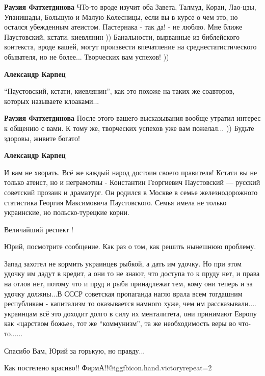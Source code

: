 \begin{itemize}
\begin{itemize}
\textbf{Раузия Фатхетдинова} ЧТо-то вроде изучит оба Завета, Талмуд, Коран, Лао-цзы, Упанишады, Большую и Малую Колесницы, если вы в курсе о чем это, но остался убежденным атеистом. Пастернака - так да! - не люблю. Мне ближе Паустовский, кстати, киевлянин ))
Банальности, вырванные из библейского контекста, вроде вашей, могут произвести впечатление на среднестатистического обывателя, но не более...
Творческих вам успехов! ))

\textbf{Александр Карпец} 

\enquote{Паустовский, кстати, киевлянин}, как это похоже на таких же соавторов,
которых называете клоаками...

\textbf{Раузия Фатхетдинова} После этого вашего высказывания вообще утратил интерес к общению с вами.
К тому же, творческих успехов уже вам пожелал... ))
Будьте здоровы, живите богато!

\textbf{Александр Карпец} 

И вам не хворать. Всё же каждый народ достоин своего правителя! Кстати вы не
только атеист, но и неграмотны - Константин Георгиевич Паустовский — русский
советский прозаик и драматург. Он родился в Москве в семье железнодорожного
статистика Георгия Максимовича Паустовского. Семья имела не только украинские,
но польско-турецкие корни.

\end{itemize} %

Величайший респект !

Юрий, посмотрите сообщение. Как раз о том, как решить нынешнюю проблему.


Запад захотел не кормить украинцев рыбкой, а дать им удочку. Но при этом удочку
им дадут в кредит, а они то не знают, что доступа то к пруду нет, и права на
отлов нет, потому что и пруд и рыба принадлежат тем, кому они теперь и за
удочку должны...В СССР советская пропаганда нагло врала всем тогдашним
республикам - капитализм то оказывается намного хуже, чем им
рассказывали.... украинцам всё это доходит долго в силу их менталитета, они
принимают Европу как «царством божье», тот же \enquote{коммунизм}, та же необходимость
веры во что-то......


Спасибо Вам, Юрий за горькую, но правду...

Как постелено красиво!! ФирмА!!@igg{fbicon.hand.victory}{repeat=2}


\end{itemize}

